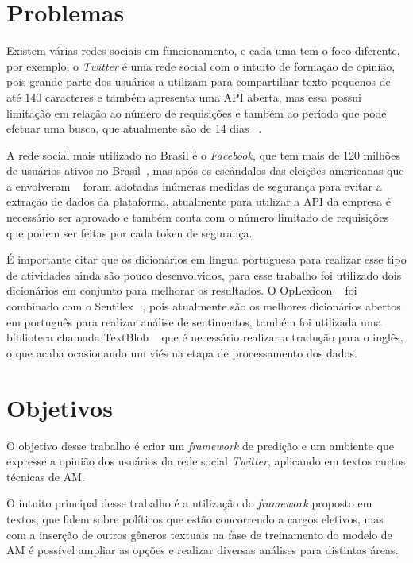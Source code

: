 %

\section{Problemas}

Existem várias redes sociais em funcionamento, e cada uma tem o foco diferente, por exemplo, o \textit{Twitter} é uma rede social com o intuito de formação de opinião, pois
grande parte dos usuários a utilizam para compartilhar texto pequenos de até 140 caracteres e também apresenta uma \acrshort{API} aberta, mas essa possui limitação 
em relação ao número de requisições e também ao período que pode efetuar uma busca, que atualmente são de 14 dias ~\cite{Twitter}.

A rede social mais utilizado no Brasil é o \textit{Facebook}, que tem mais de 120 milhões de usuários ativos no Brasil~\cite{EBC}, mas após os escândalos das eleições americanas que a envolveram ~\cite{face}
foram adotadas inúmeras medidas de segurança para evitar a extração de dados da plataforma, atualmente para utilizar a \acrshort{API} da empresa é necessário ser aprovado e também conta com o número limitado
de requisições que podem ser feitas por cada token de segurança.

É importante citar que os dicionários em língua portuguesa para realizar esse tipo de atividades ainda são pouco desenvolvidos, para esse trabalho foi utilizado dois dicionários em conjunto para melhorar 
os resultados. O OpLexicon ~\cite{souza} foi combinado com o Sentilex ~\cite{Neuenschwander}, pois atualmente são os melhores dicionários abertos em português para realizar análise de sentimentos, também foi utilizada
uma biblioteca chamada TextBlob ~\cite{textblob} que é necessário  realizar a tradução para o inglês, o que acaba ocasionando um viés na etapa de processamento dos dados.
\section{Objetivos}

O objetivo desse trabalho é criar um \textit{framework} de predição e um ambiente que expresse a opinião dos usuários da rede social \textit{Twitter},
aplicando em textos curtos técnicas de \acrshort{AM}.

O intuito principal desse trabalho é a utilização do \textit{framework} proposto em textos,
que falem sobre políticos que estão concorrendo a cargos eletivos, 
mas com a inserção de outros gêneros textuais na fase de treinamento do modelo de \acrshort{AM} é possível
ampliar as opções e realizar diversas análises para distintas áreas.


